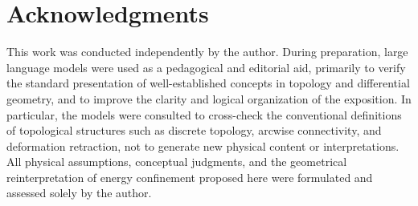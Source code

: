 \documentclass[%
 reprint,
 amsmath,amssymb,
 aps,
 prb,
]{revtex4-2}
\numberwithin{equation}{section}
\begin{document}
\section*{Acknowledgments}
This work was conducted independently by the author. During preparation, large language models were used as a pedagogical and editorial aid, primarily to verify the standard presentation of well-established concepts in topology and differential geometry, and to improve the clarity and logical organization of the exposition. 
In particular, the models were consulted to cross-check the conventional definitions of topological structures such as discrete topology, arcwise connectivity, and deformation retraction, not to generate new physical content or interpretations. All physical assumptions, conceptual judgments, and the geometrical reinterpretation of energy confinement proposed here were formulated and assessed solely by the author.
\end{document}
